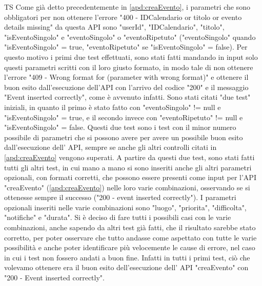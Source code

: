 \begin{listaPersonale}{TS}
                Come già detto precedentemente in \ref{apd:creaEvento}, i parametri che sono obbligatori per non ottenere l'errore "400 - IDCalendario or titolo or evento details missing" da questa API sono "userId", "IDCalendario", "titolo", "isEventoSingolo" e "eventoSingolo" o "eventoRipetuto" ("eventoSingolo" quando "isEventoSingolo" = true, "eventoRipetuto" se "isEventoSingolo" = false). Per questo motivo i primi due test effettuati, sono stati fatti mandando in input solo questi parametri scritti con il loro giusto formato, in modo tale di non ottenere l'errore "409 - Wrong format for (parameter with wrong format)" e ottenere il buon esito dall'esecuzione dell'API con l'arrivo del codice "200" e il messaggio "Event inserted correctly", come è avvenuto infatti. Sono stati citati "due test" iniziali, in quanto il primo è stato fatto con "eventoSingolo" != null e "isEventoSingolo" = true, e il secondo invece con "eventoRipetuto" != null e "isEventoSingolo" = false. Questi due test sono i test con il minor numero possibile di parametri che si possono avere per avere un possibile buon esito dall'esecuzione dell' API, sempre se anche gli altri controlli citati in \ref{apd:creaEvento} vengono superati.
                A partire da questi due test, sono stati fatti tutti gli altri test, in cui mano a mano si sono inseriti anche gli altri parametri opzionali, con formati corretti, che possono essere presenti come input per l'API "creaEvento" (\ref{apd:creaEvento}) nelle loro varie combinazioni, osservando se si ottenesse sempre il successo ("200 - event inserted correctly"). I parametri opzionali inseriti nelle varie combinazioni sono "luogo", "priorita", "difficolta", "notifiche" e "durata". Si è deciso di fare tutti i possibili casi con le varie combinazioni, anche sapendo da altri test già fatti, che il risultato sarebbe stato corretto, per poter osservare che tutto andasse come aspettato con tutte le varie possibilità e anche poter identificare più velocemente le cause di errore, nel caso in cui i test non fossero andati a buon fine. Infatti in tutti i primi test, ciò che volevamo ottenere era il buon esito dell'esecuzione dell' API "creaEvento" con "200 - Event inserted correctly".
                \begin{center}

\end{center}
\end{listaPersonale}
